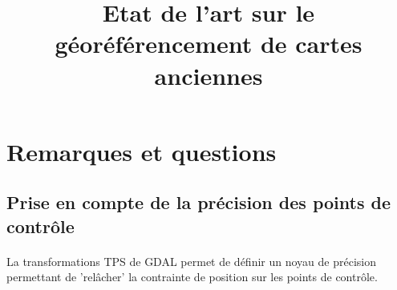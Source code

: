 \documentclass[a4paper,10pt]{article}
\title{Etat de l'art sur le géoréférencement de cartes anciennes}
\author{}
\begin{document}
\maketitle

\begin{abstract}

\end{abstract}
\section{}

\section{Remarques et questions}
\subsection{Prise en compte de la précision des points de contrôle}
\paragraph{}
La transformations TPS de GDAL permet de définir un noyau de précision permettant de 'relâcher' la contrainte de position sur les points de contrôle. 
\end{document}
